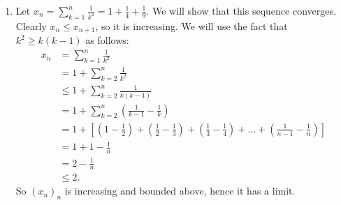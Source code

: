 \begin{example}
\begin{enumerate}[label = (\arabic*)]
            \item Let $x_n = \sum_{k=1}^n \frac{1}{k^2} = 1 + \frac{1}{4} + \frac{1}{9}$. We will show that this sequence converges. Clearly $x_n \leq x_{n+1}$, so it is increasing. We will use the fact that $k^2 \geq k(k-1)$ as follows:
                \begin{equation*}
                \begin{split}
                    x_n 
                    &= \sum_{k=1}^n \frac{1}{k^2}\\
                    &= 1 + \sum_{k=2}^n \frac{1}{k^2} \\
                    &\leq 1 + \sum_{k=2}^n \frac{1}{k(k-1)} \\
                    & = 1 + \sum_{k=2}^n \left(\frac{1}{k-1} - \frac{1}{k}\right) \\
                    & = 1 + \left[\left(1 - \frac{1}{2}\right) + \left(\frac{1}{2} - \frac{1}{3}\right) + \left(\frac{1}{3}- \frac{1}{4}\right) + ... + \left(\frac{1}{n-1} - \frac{1}{n}\right)\right] \\
                    & = 1 + 1 -\frac{1}{n} \\
                    & = 2 - \frac{1}{n} \\
                    & \leq 2.
                \end{split}
                \end{equation*}
            So $(x_n)_n$ is increasing and bounded above, hence it has a limit.


\end{enumerate}
\end{example}
